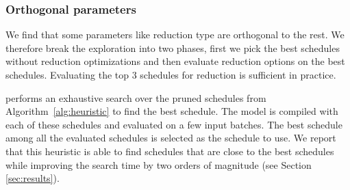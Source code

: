  \subsubsection*{Orthogonal parameters} We find that some parameters like reduction type are orthogonal to the rest. 
  We therefore break the exploration into two phases, first we pick the best schedules without reduction
  optimizations and then evaluate reduction options on the best schedules.
  Evaluating the top 3 schedules for reduction is sufficient in practice.  

\noindent
\Treebeard{} performs an exhaustive search over the pruned schedules from Algorithm~\ref{alg:heuristic} to find the best schedule.
The model is compiled with each of these schedules and evaluated on a few input batches. 
The best schedule among all the evaluated schedules is selected as the schedule to use.
We report that this heuristic is able to find schedules that are close to the best schedules
while improving the search time by two orders of magnitude (see Section \ref{sec:results}).

